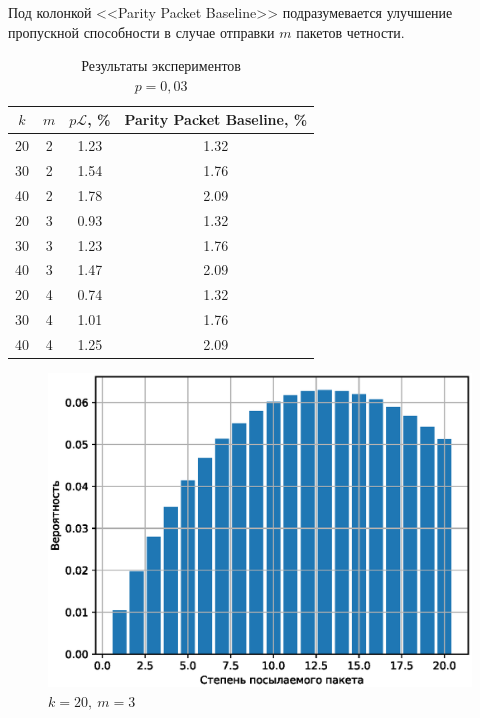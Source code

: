 Под колонкой 
<<Parity Packet Baseline>> подразумевается улучшение пропускной способности
в случае отправки $m$ пакетов четности.

\begin{table}[h!]
\begin{center}
    \begin{tabular}{|c|c|c|c|}
        \hline
        $k$ & $m$ & $p\mathcal L$, \% & Parity Packet Baseline, \% \\
        \hline
        20 & 2 & 1.23 & 1.32 \\
        \hline
        30 & 2 & 1.54 & 1.76 \\
        \hline
        40 & 2 & 1.78 & 2.09 \\
        \hline 
        \hline 
        20 & 3 & 0.93 & 1.32 \\
        \hline
        30 & 3 & 1.23 & 1.76 \\
        \hline
        40 & 3 & 1.47 & 2.09 \\ 
        \hline
        \hline
        20 & 4 & 0.74 & 1.32 \\
        \hline 
        30 & 4 & 1.01 & 1.76 \\
        \hline
        40 & 4 & 1.25 & 2.09\\
        \hline
    \end{tabular}
\caption{Результаты экспериментов\\$p=0{,}03$}
\label{tab:strategy2_results3}
\end{center}
\end{table}

\begin{figure}[ht]
    \centering
    \includegraphics[scale=0.5]{img/distr1.eps}
    \caption{$k=20, \: m=3$}
    \label{fig:dist1}
\end{figure}

